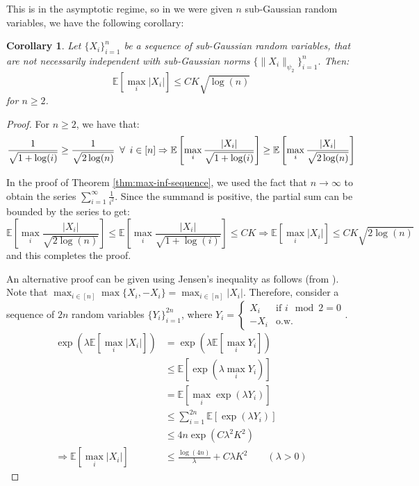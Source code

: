 \documentclass{article}
\newtheorem{corollary}{Corollary}[subsection]
\theoremstyle{remark}
\newcommand{\Exp}{\mathbb{E}}
\begin{document}
This is in the asymptotic regime, so in we were given \(n\) sub-Gaussian random variables, we have the following corollary:
\begin{corollary}
Let \(\{X_{i}\}_{i=1}^{n}\) be a sequence of sub-Gaussian random variables, that are not necessarily independent with sub-Gaussian norms \(\{\|X_{i}\|_{\psi_{2}}\}_{i=1}^{n}\). Then:
\begin{equation*}
\Exp\left[\max_{i}|X_{i}|\right] \leq CK\sqrt{\log(n)}
\end{equation*}
for \(n \geq 2\).
\end{corollary}

\begin{proof}
For \(n \geq 2\), we have that:
\begin{equation*}
\frac{1}{\sqrt{1 + \log(i)}} \geq \frac{1}{\sqrt{2\log(n)}} \enskip \forall \enskip i \in [n] \Rightarrow \Exp\left[\max_{i}\frac{|X_{i}|}{\sqrt{1 + \log(i)}}\right] \geq \Exp\left[\max_{i}\frac{|X_{i}|}{\sqrt{2\log(n)}}\right]
\end{equation*}

In the proof of Theorem \ref{thm:max-inf-sequence}, we used the fact that \(n \to \infty\) to obtain the series \(\sum\limits_{i=1}^{\infty} \frac{1}{i^{2}}\). Since the summand is positive, the partial sum can be bounded by the series to get:
\begin{equation*}
\Exp\left[\max_{i}\frac{|X_{i}|}{\sqrt{2\log(n)}}\right] \leq \Exp\left[\max_{i}\frac{|X_{i}|}{\sqrt{1 + \log(i)}}\right] \leq CK \Rightarrow \Exp\left[\max_{i}|X_{i}|\right] \leq CK\sqrt{2\log(n)}
\end{equation*}
and this completes the proof.

An alternative proof can be given using Jensen's inequality as follows (from \cite[Lemma 2.2]{devroye2012combinatorial}).
Note that \(\max_{i \in [n]} \max\{X_{i}, -X_{i}\} = \max_{i \in [n]} |X_{i}|\). Therefore, consider a sequence of \(2n\) random variables \(\{Y_{i}\}_{i=1}^{2n}\), where \(Y_{i} = \begin{cases} X_{i} & \text{if } i \mod 2 = 0 \\ -X_{i} & \text{o.w.} \end{cases}\).
\begin{align*}
\exp\left(\lambda \Exp\left[\max_{i} |X_{i}|\right]\right) &= \exp\left(\lambda \Exp\left[\max_{i} Y_{i}\right]\right) \\
&\leq \Exp\left[\exp\left(\lambda \max_{i}Y_{i}\right)\right] \\
&= \Exp\left[\max_{i} \exp\left(\lambda Y_{i}\right)\right] \\
&\leq \sum_{i=1}^{2n} \Exp\left[\exp(\lambda Y_{i})\right] \\
&\leq 4n \exp\left(C\lambda^{2}K^{2}\right) \\
\Rightarrow \Exp\left[\max_{i} |X_{i}|\right] &\leq \frac{\log(4n)}{\lambda} + C\lambda K^{2} \qquad (\lambda > 0)
\end{align*}


\end{proof}
\end{document}
